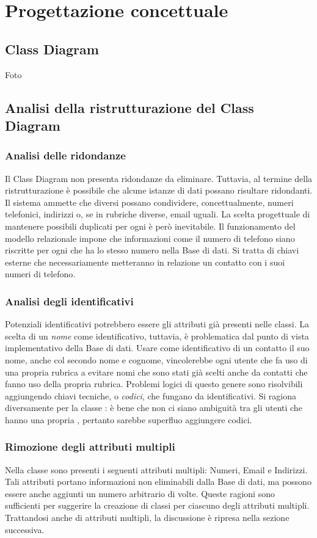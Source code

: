 \chapter{Progettazione concettuale}
\section{Class Diagram}
{\Huge Foto}
        
\section{Analisi della ristrutturazione del Class Diagram}

       
\subsection{Analisi delle ridondanze}
Il Class Diagram non presenta ridondanze da eliminare. Tuttavia, al termine della ristrutturazione è possibile che alcune istanze di dati possano risultare ridondanti. Il sistema ammette che \contatti diversi possano condividere, concettualmente, numeri telefonici, indirizzi o, se in rubriche diverse, email uguali. La scelta progettuale di mantenere possibili duplicati per ogni \contatto è però inevitabile. Il funzionamento del modello relazionale impone che informazioni come il numero di telefono siano riscritte per ogni \contatto che ha lo stesso numero nella Base di dati. Si tratta di chiavi esterne che necessariamente metteranno in relazione un contatto con i suoi numeri di telefono. 
\subsection{Analisi degli identificativi}
Potenziali identificativi potrebbero essere gli attributi già presenti nelle classi. La scelta di un \emph{nome} come identificativo, tuttavia, è problematica dal punto di vista implementativo della Base di dati. Usare come identificativo di un contatto il suo nome, anche col secondo nome e cognome, vincolerebbe ogni utente che fa uso di una propria rubrica a evitare nomi che sono stati già scelti anche da contatti che fanno uso della propria rubrica. Problemi logici di questo genere sono risolvibili aggiungendo chiavi tecniche, o \emph{codici}, che fungano da identificativi. Si ragiona diversamente per la classe \Rubrica: è bene che non ci siano ambiguità tra gli utenti che hanno una propria \rubrica, pertanto sarebbe superfluo aggiungere codici. 
\subsection{Rimozione degli attributi multipli}
Nella classe \Contatto sono presenti i seguenti attributi multipli: Numeri, Email e Indirizzi. Tali attributi portano informazioni non eliminabili dalla Base di dati, ma possono essere anche aggiunti un numero arbitrario di volte. Queste ragioni sono sufficienti per suggerire la creazione di classi per ciascuno degli attributi multipli. Trattandosi anche di attributi multipli, la discussione è ripresa nella sezione successiva. 
